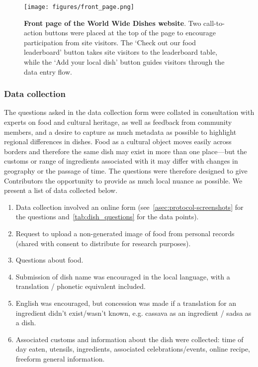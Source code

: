  

\begin{figure}[t]
    \centering
    \texttt{[image: figures/front\_page.png]}
    \caption{\textbf{Front page of the World Wide Dishes website}. Two call-to-action buttons were placed at the top of the page to encourage participation from site visitors. The ‘Check out our food leaderboard’ button takes site visitors to the leaderboard table, while the ‘Add your local dish’ button guides visitors through the data entry flow.}
    \label{fig:front_page}
\end{figure}

\subsubsection{Data collection}
The questions asked in the data collection form were collated in consultation with experts on food and cultural heritage, as well as feedback from community members, and a desire to capture as much metadata as possible to highlight regional differences in dishes. Food as a cultural object moves easily across borders and therefore the same dish may exist in more than one place---but the customs or range of ingredients associated with it may differ with changes in geography or the passage of time. The questions were therefore designed to give Contributors the opportunity to provide as much local nuance as possible. We present a list of data collected below.

\begin{enumerate}
    \item Data collection involved an online form (see~\cref{asec:protocol-screenshots} for the questions and~\cref{tab:dish_questions} for the data points).
    \item Request to upload a non-generated image of food from personal records (shared with consent to distribute for research purposes). 
    \item Questions about food. 
    \item Submission of dish name was encouraged in the local language, with a translation / phonetic equivalent included.
    \item English was encouraged, but concession was made if a translation for an ingredient didn't exist/wasn't known, e.g. cassava as an ingredient / sadsa as a dish.
    \item Associated customs and information about the dish were collected: time of day eaten, utensils, ingredients, associated celebrations/events, online recipe, freeform general information.
\end{enumerate}


